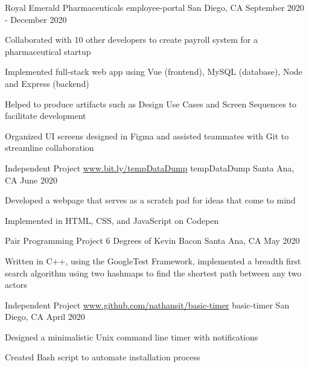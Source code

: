 \begin{cventries}
  \cventry
    {Royal Emerald Pharmaceuticals}
    {employee-portal}
    {San Diego, CA}
    {September 2020 - December 2020}
    {
      \begin{cvitems}
        \item {Collaborated with 10 other developers to create payroll system for a pharmaceutical startup}
        \item {Implemented full-stack web app using Vue (frontend), MySQL (database), Node and Express (backend)}
        \item {Helped to produce artifacts such as Design Use Cases and Screen Sequences to facilitate development}
        \item {Organized UI screens designed in Figma and assisted teammates with Git to streamline collaboration}
      \end{cvitems}
    }
  \cventry
    {Independent Project \url{www.bit.ly/tempDataDump}}
    {tempDataDump}
    {Santa Ana, CA}
    {June 2020}
    {
      \begin{cvitems}
        \item {Developed a webpage that serves as a scratch pad for ideas that come to mind}
        \item {Implemented in HTML, CSS, and JavaScript on Codepen}
      \end{cvitems}
    }
  \cventry
    {Pair Programming Project}
    {6 Degrees of Kevin Bacon}
    {Santa Ana, CA}
    {May 2020}
    {
     \begin{cvitems}
      \item {Written in C++, using the GoogleTest Framework, implemented a breadth first search algorithm using two hashmaps to find the shortest path between any two actors}
     \end{cvitems}
    }
  \cventry
    {Independent Project \url{www.github.com/nathansit/basic-timer}}
    {basic-timer}
    {San Diego, CA}
    {April 2020}
    {
     \begin{cvitems}
      \item {Designed a minimalistic Unix command line timer with notifications}
      \item {Created Bash script to automate installation process}
     \end{cvitems}
    }
    \cventry
\end{cventries}

